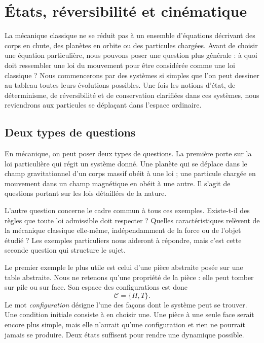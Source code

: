 \chapter{États, réversibilité et cinématique}

La mécanique classique ne se réduit pas à un ensemble d’équations décrivant des corps en chute, des planètes en orbite ou des particules chargées. Avant de choisir une équation particulière, nous pouvons poser une question plus générale : à quoi doit ressembler une loi du mouvement pour être considérée comme une loi classique ? Nous commencerons par des systèmes si simples que l’on peut dessiner au tableau toutes leurs évolutions possibles. Une fois les notions d’état, de déterminisme, de réversibilité et de conservation clarifiées dans ces systèmes, nous reviendrons aux particules se déplaçant dans l’espace ordinaire.

\section{Deux types de questions}

En mécanique, on peut poser deux types de questions. La première porte sur la loi particulière qui régit un système donné. Une planète qui se déplace dans le champ gravitationnel d’un corps massif obéit à une loi ; une particule chargée en mouvement dans un champ magnétique en obéit à une autre. Il s’agit de questions portant sur les lois détaillées de la nature.

L’autre question concerne le cadre commun à tous ces exemples. Existe-t-il des règles que toute loi admissible doit respecter ? Quelles caractéristiques relèvent de la mécanique classique elle-même, indépendamment de la force ou de l’objet étudié ? Les exemples particuliers nous aideront à répondre, mais c’est cette seconde question qui structure le sujet.

Le premier exemple le plus utile est celui d’une pièce abstraite posée sur une table abstraite. Nous ne retenons qu’une propriété de la pièce : elle peut tomber sur pile ou sur face. Son espace des configurations est donc
\begin{equation}
  \mathcal C=\{H,T\}.
\end{equation}
Le mot \emph{configuration} désigne l’une des façons dont le système peut se trouver. Une condition initiale consiste à en choisir une. Une pièce à une seule face serait encore plus simple, mais elle n’aurait qu’une configuration et rien ne pourrait jamais se produire. Deux états suffisent pour rendre une dynamique possible.

